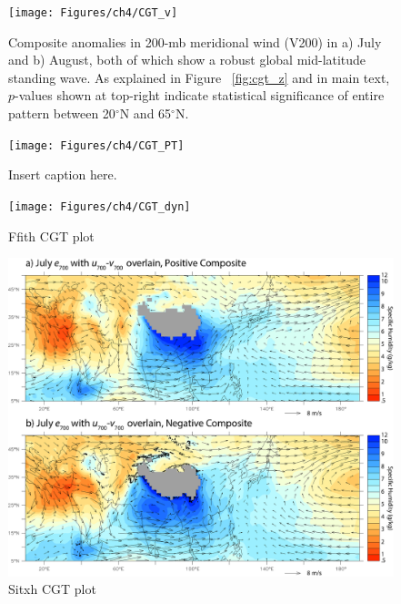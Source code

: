 \begin{figure}
\centering
\noindent\texttt{[image: Figures/ch4/CGT\_v]}
\caption{Composite anomalies in 200-mb meridional wind (V200) in a) July and b) August, both of which show a robust global mid-latitude standing wave. As explained in Figure ~\ref{fig:cgt_z} and in main text, $p$-values shown at top-right indicate statistical significance of entire pattern between 20$^{\circ}$N and 65$^{\circ}$N.}
\label{fig:cgt_v}
\end{figure}

\begin{figure}
\centering
\noindent\texttt{[image: Figures/ch4/CGT\_PT]}
\caption{Insert caption here.}
\label{fig:cgt_v}
\end{figure}




\begin{figure}
\centering
\noindent\texttt{[image: Figures/ch4/CGT\_dyn]}
\caption{Ffith CGT plot}
\label{fig:cgt_dyn}
\end{figure}

\begin{figure}
\centering
\noindent\includegraphics[width=36pc]{Figures/ch4/CGT_700}
\caption{Sitxh CGT plot}
\label{fig:cgt_700}
\end{figure}

